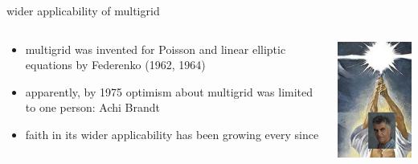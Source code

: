 \documentclass[hide notes,intlimits,usenames,dvipsnames]{beamer}
\begin{document}
\begin{frame}{wider applicability of multigrid}

\begin{columns}
\begin{column}{0.8\textwidth}
\begin{itemize}
\item multigrid was invented for Poisson and linear elliptic equations by Federenko (1962, 1964)
\item apparently, by 1975 optimism about multigrid was limited to one person: Achi Brandt
\item faith in its wider applicability has been growing every since
\end{itemize}
\end{column}

\begin{column}{0.15\textwidth}

\includegraphics[width=\textwidth]{figs/starwars-achi-mashup.jpg}
\end{column}
\end{columns}
\end{frame}
\end{document}
